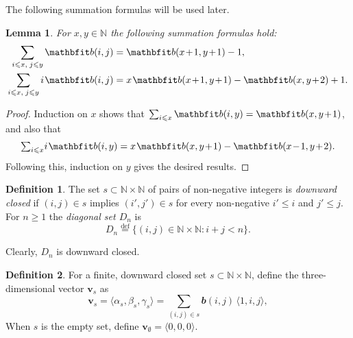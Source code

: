 \documentclass[reqno]{amsart}
\newtheorem{lemma}[theorem]{Lemma}
\theoremstyle{definition}
\newtheorem{definition}{Definition}
\newcommand\tsp{\mkern 1.5mu}
\renewcommand\ge{\geqslant}\renewcommand\le{\leqslant}
\newcommand\N{\mathbb N}  %
\def\<{\langle}\def\>{\rangle}
\def\b{\mathbfit b}
\newcommand\eqdef{\stackrel{\mathrm{def}}{=}}
\newcommand\tsum{{\textstyle\sum}}
\def\m#1{\tsp{#1}\tsp}
\begin{document}
The following summation formulas will be used later.

\begin{lemma}\label{lemma:bsum}
For $x, y\in\N$ the following summation formulas hold:
\begin{align*}
  \sum_{i\le x,\;j\le y} \b(i,j) & = \b(x\m+1,y\m+1)-1, \\
  \sum_{i\le x,\;j\le y} i\tsp\b(i,j) &= x\tsp\b(x\m+1,y\m+1)
            -\b(x,y\m+2)+1.
\end{align*}
\end{lemma}
\begin{proof}
Induction on $x$ shows that $\sum_{i\le x} \b(i,y)=
\b(x,y\m+1)$, and also that
$$
    \tsum_{i\le x} i\tsp\b(i,y) = x\tsp\b(x,y\m+1)-\b(x\m-1,y\m+2).
$$
Following this, induction on $y$ gives the desired results.
\end{proof}

\begin{definition}
The set $s\subset \N\times \N$ of pairs of non-negative integers is
\emph{downward closed} if $(i,j)\in s$ implies $(i',j')\in s$ for
every non-negative $i'\le i$ and $j'\le j$. For $n\ge 1$ the
\emph{diagonal set $D_n$} is
$$
    D_n \eqdef \{ (i,j)\in\N\times\N: i+j< n \}.
$$
\end{definition}
Clearly, $D_n$ is downward closed.

\begin{definition}\label{def:triplets}
For a finite, downward closed set $s\subset\N\times\N$, define the
three-dimensional vector $\mathbf v_s$ as
$$
   \mathbf v_s =\< \alpha_s,\beta_s,\gamma_s\>
     = \sum_{(i,j)\in s} \b(i,j)\,\< 1,i,j\>,
$$
When $s$ is the empty set, define $\mathbf v_\emptyset =\< 0,0,0\>$.
\end{definition}
\end{document}
